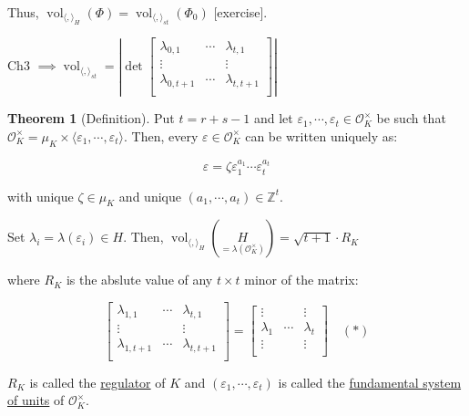 \documentclass[openany]{amsbook}
\numberwithin{section}{chapter}
\theoremstyle{definition}
\newtheorem{theorem}{Theorem}[chapter]
\begin{document}
Thus, \(\operatorname{vol}_{\langle , \rangle _H} (\Phi) =\operatorname{vol}_{\langle , \rangle_{st}}(\Phi_0)\) [exercise].

Ch3 \(\implies \operatorname{vol}_{\langle , \rangle_{s t}} = \left\vert \det \begin{bmatrix}
    \lambda_{0,1} & \cdots &  \lambda_{t,1} \\
    \vdots &  &  \vdots \\
    \lambda_{0,t+1} & \cdots &  \lambda_{t,t+1} \\
\end{bmatrix} \right\vert \) 

\begin{theorem}
    [Definition] Put \(t = r+s-1\) and let \(\varepsilon_1, \cdots , \varepsilon_t \in \mathcal{O}_K^\times\) be such that \(\mathcal{O}_K^\times = \mu_K \times \langle \varepsilon_1, \cdots , \varepsilon_t \rangle \). Then, every \(\varepsilon \in \mathcal{O}_K^\times \) can be written uniquely as:

    \[
        \varepsilon = \zeta \varepsilon_1^{a_1} \cdots \varepsilon_{t}^{a_t}
    \]

    with unique \(\zeta \in \mu_K\) and unique \((a_1, \cdots , a_t)\in \mathbb{Z}^t\).

    Set \(\lambda_i = \lambda(\varepsilon_i) \in H\). Then, \(\operatorname{vol}_{\langle , \rangle _H} (\underset{=\lambda(\mathcal{O}_K^\times)}{H}) = \sqrt{t+1} \cdot R_K\) 

    where \(R_K\) is the abslute value of any \(t \times t\) minor of the matrix: 
    
    \[
        \begin{bmatrix}
        \lambda_{1,1} & \cdots &  \lambda_{t,1} \\
        \vdots &  &  \vdots \\
        \lambda_{1,t+1} & \cdots &  \lambda_{t,t+1} \\
        \end{bmatrix} = \begin{bmatrix}
        \vdots &  &  \vdots \\
        \lambda_1 & \cdots &  \lambda _t \\
        \vdots &  &  \vdots \\
        \end{bmatrix} \quad (\ast)
    \]
    
    \(R_K\) is called the \underline{regulator} of \(K\) and \((\varepsilon_1, \cdots , \varepsilon_t)\) is called the \underline{fundamental system of units} of \(\mathcal{O}_K^\times \).
    
\end{theorem}
\end{document}
